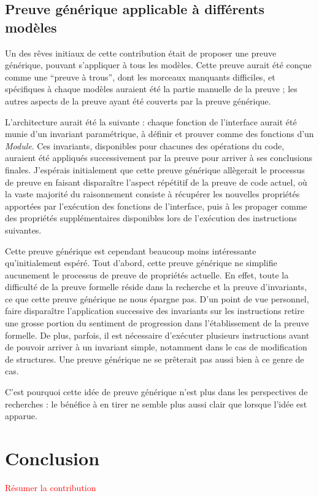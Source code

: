 		\subsection{Preuve générique applicable à différents modèles}

		Un des rêves initiaux de cette contribution était de proposer une preuve générique, pouvant s'appliquer à tous les modèles. Cette preuve aurait été conçue comme une ``preuve à trous'', dont les morceaux manquants difficiles, et spécifiques à chaque modèles auraient été la partie manuelle de la preuve ; les autres aspects de la preuve ayant été couverts par la preuve générique.

		L'architecture aurait été la suivante : chaque fonction de l'interface aurait été munie d'un invariant paramétrique, à définir et prouver comme des fonctions d'un \emph{Module}. Ces invariants, disponibles pour chacunes des opérations du code, auraient été appliqués successivement par la preuve pour arriver à ses conclusions finales. J'espérais initialement que cette preuve générique allègerait le processus de preuve en faisant disparaître l'aspect répétitif de la preuve de code actuel, où la vaste majorité du raisonnement consiste à récupérer les nouvelles propriétés apportées par l'exécution des fonctions de l'interface, puis à les propager comme des propriétés supplémentaires disponibles lors de l'exécution des instructions suivantes.

		Cette preuve générique est cependant beaucoup moins intéressante qu'initialement espéré. Tout d'abord, cette preuve générique ne simplifie aucunement le processus de preuve de propriétés actuelle. En effet, toute la difficulté de la preuve formelle réside dans la recherche et la preuve d'invariants, ce que cette preuve générique ne nous épargne pas. D'un point de vue personnel, faire disparaître l'application successive des invariants sur les instructions retire une grosse portion du sentiment de progression dans l'établissement de la preuve formelle. De plus, parfois, il est nécessaire d'exécuter plusieurs instructions avant de pouvoir arriver à un invariant simple, notamment dans le cas de modification de structures. Une preuve générique ne se prêterait pas aussi bien à ce genre de cas.

		C'est pourquoi cette idée de preuve générique n'est plus dans les perspectives de recherches : le bénéfice à en tirer ne semble plus aussi clair que lorsque l'idée est apparue.

		\section{Conclusion}

		\textcolor{red}{Résumer la contribution}
